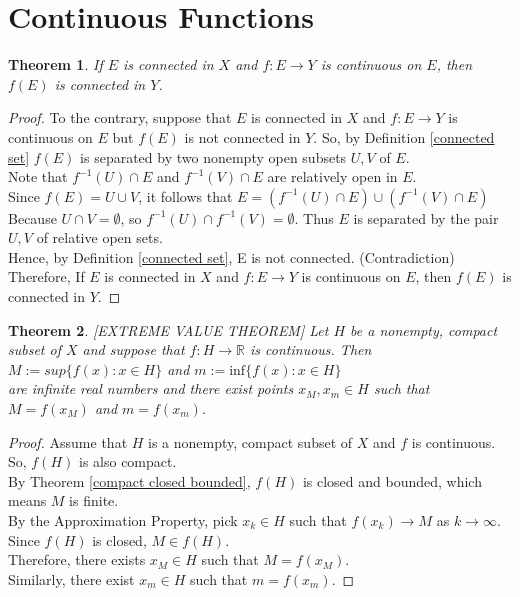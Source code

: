 \documentclass[12pt, reqno]{amsart}
\newtheorem{theorem}{Theorem}[section]
\theoremstyle{definition}
\numberwithin{equation}{section}
\newcommand{\dR}{{\mathbb R}}
\begin{document}
\section{Continuous Functions}
\begin{theorem}\cite{s1}
    If $E$ is connected in $X$ and $f:E \rightarrow Y$ is continuous on $E$, then $f(E)$ is connected in $Y$.
\end{theorem}
\begin{proof}
    To the contrary, suppose that $E$ is connected in $X$ and $f:E \rightarrow Y$ is continuous on $E$ but $f(E)$ is not connected in $Y$. So, by Definition \ref{connected set} $f(E)$ is separated by two nonempty open subsets $U, V$ of $E$.\\
    Note that $f^{-1}(U) \cap E$ and $f^{-1}(V) \cap E$ are relatively open in $E$.\\
    Since $f(E) = U \cup V$, it follows that $E =(f^{-1}(U) \cap E) \cup (f^{-1}(V) \cap E)$\\
    Because $U \cap V = \emptyset$, so $f^{-1}(U) \cap f^{-1}(V) = \emptyset$. Thus $E$ is separated by the pair $U, V$ of relative open sets.\\
    Hence, by Definition \ref{connected set}, E is not connected. (Contradiction)
    Therefore, If $E$ is connected in $X$ and $f:E \rightarrow Y$ is continuous on $E$, then $f(E)$ is connected in $Y$.
\end{proof}
\begin{theorem} \cite{s1} [EXTREME VALUE THEOREM]
Let $H$ be a nonempty, compact subset of $X$ and suppose that $f:H \rightarrow \dR$ is continuous. Then\\
\hspace*{4.5cm} $M:= sup\{f(x):x \in H\}$ and $m:= \text{inf}\{f(x):x \in H\}$\\
are infinite real numbers and there exist points $x_M, x_m \in H$ such that $M = f(x_M)$ and $m = f(x_m)$.
\end{theorem}
\begin{proof}
Assume that $H$ is a nonempty, compact subset of $X$ and $f$ is continuous. So, $f(H)$ is also compact.\\
By Theorem \ref{compact closed bounded}, $f(H)$ is closed and bounded, which means $M$ is finite.\\
By the Approximation Property, pick $x_k \in H$ such that $f(x_k) \rightarrow M$ as $k \rightarrow \infty$. Since $f(H)$ is closed, $M \in f(H)$.\\
Therefore, there exists $x_M \in H$ such that $M = f(x_M)$.\\
Similarly, there exist $x_m \in H$ such that $m = f(x_m)$.
\end{proof}
\end{document}
